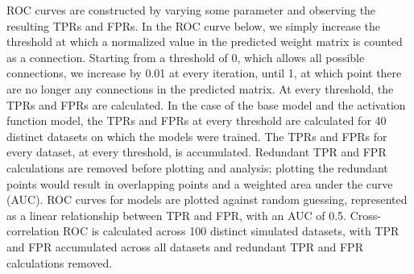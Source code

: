 \documentclass[11pt,titlepage]{article}
\begin{document}
ROC curves are constructed by varying some parameter and observing the resulting TPRs and FPRs. In the ROC curve below, we simply increase the threshold at which a normalized value in the predicted weight matrix is counted as a connection. Starting from a threshold of 0, which allows all possible connections, we increase by 0.01 at every iteration, until 1, at which point there are no longer any connections in the predicted matrix. At every threshold, the TPRs and FPRs are calculated. In the case of the base model and the activation function model, the TPRs and FPRs at every threshold are calculated for 40 distinct datasets on which the models were trained. The TPRs and FPRs for every dataset, at every threshold, is accumulated. Redundant TPR and FPR calculations are removed before plotting and analysis; plotting the redundant points would result in overlapping points and a weighted area under the curve (AUC). ROC curves for models are plotted against random guessing, represented as a linear relationship between TPR and FPR, with an AUC of 0.5. Cross-correlation ROC is calculated across 100 distinct simulated datasets, with TPR and FPR accumulated across all datasets and redundant TPR and FPR calculations removed.\par
\end{document}
